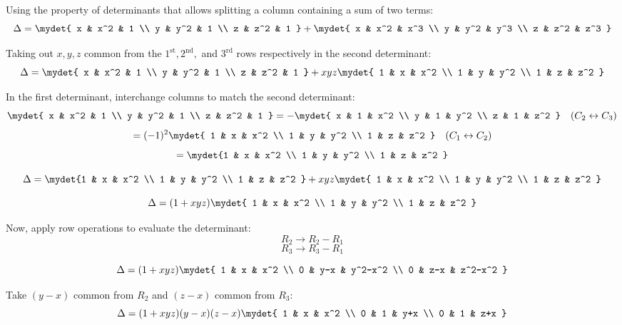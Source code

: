 \begin{enumerate}[label=\thesubsection.\arabic*, ref=\thesubsection.\theenumi]
Using the property of determinants that allows splitting a column containing a sum of two terms:
$$\Delta = \mydet{ x & x^2 & 1 \\ y & y^2 & 1 \\ z & z^2 & 1 } + \mydet{ x & x^2 & x^3 \\ y & y^2 & y^3 \\ z & z^2 & z^3 }$$

Taking out $x, y, z$ common from the $1^{\text{st}}, 2^{\text{nd}},$ and $3^{\text{rd}}$ rows respectively in the second determinant:
$$\Delta = \mydet{ x & x^2 & 1 \\ y & y^2 & 1 \\ z & z^2 & 1 } + xyz \mydet{ 1 & x & x^2 \\ 1 & y & y^2 \\ 1 & z & z^2 }$$

In the first determinant, interchange columns to match the second determinant:
$$
\mydet{ x & x^2 & 1 \\ y & y^2 & 1 \\ z & z^2 & 1 } = -\mydet{ x & 1 & x^2 \\ y & 1 & y^2 \\ z & 1 & z^2 } \quad (C_2 \leftrightarrow C_3) \\$$
$$= (-1)^2 \mydet{ 1 & x & x^2 \\ 1 & y & y^2 \\ 1 & z & z^2 } \quad (C_1 \leftrightarrow C_2) \\$$
$$=\mydet{1 & x & x^2 \\ 1 & y & y^2 \\ 1 & z & z^2 }$$

$$\Delta = \mydet{1 & x & x^2 \\ 1 & y & y^2 \\ 1 & z & z^2 } + xyz \mydet{ 1 & x & x^2 \\ 1 & y & y^2 \\ 1 & z & z^2 }$$

$$\Delta = (1 + xyz)\mydet{ 1 & x & x^2 \\ 1 & y & y^2 \\ 1 & z & z^2 }$$

Now, apply row operations to evaluate the determinant:
$$
R_2 \to R_2 - R_1 $$
$$R_3 \to R_3 - R_1
$$

$$\Delta = (1 + xyz) \mydet{ 1 & x & x^2 \\ 0 & y-x & y^2-x^2 \\ 0 & z-x & z^2-x^2 }$$

Take $(y-x)$ common from $R_2$ and $(z-x)$ common from $R_3$:
$$\Delta = (1 + xyz)(y - x)(z - x) \mydet{ 1 & x & x^2 \\ 0 & 1 & y+x \\ 0 & 1 & z+x }$$


\end{enumerate}
